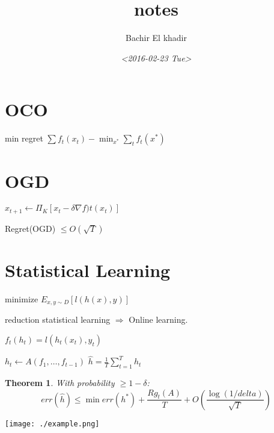\documentclass[11pt]{article}
\author{Bachir El khadir}
\date{\textit{<2016-02-23 Tue>}}
\title{notes}
\newtheorem{theorem}{Theorem}
\begin{document}
\maketitle
\tableofcontents


\section{OCO}
\label{sec:orgheadline1}
min regret \(\sum f_t(x_t) - \min_{x^*} \sum_t f_t(x^*)\)

\section{OGD}
\label{sec:orgheadline2}
\(x_{t+1} \leftarrow \Pi_K[x_t - \delta \nabla f)t(x_t)]\)

Regret(OGD) \(\le O(\sqrt T)\)

\section{Statistical Learning}
\label{sec:orgheadline3}

minimize \(E_{x, y \sim D}[l(h(x), y)]\)

reduction statistical learning \(\Rightarrow\) Online learning.

\(f_t(h_t) = l(h_t(x_t), y_t)\)


\begin{algorithm}
\(h_t \leftarrow A(f_1, \ldots, f_{t-1})\)
\(\hat h = \frac1T \sum_{t=1}^T h_t\)
\end{algorithm}

\begin{theorem}
With probability \(\ge 1 - \delta\):
$$err(\hat h) \le \min err(h^*) + \frac{Rg_t(A)}{T} + O(\frac{\log(1/delta)}{\sqrt T})$$
\end{theorem}



\texttt{[image: ./example.png]}
\end{document}
